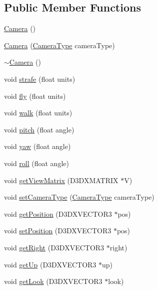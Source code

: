\subsection*{Public Member Functions}
\begin{DoxyCompactItemize}
\item 
\hyperlink{class_camera_a01f94c3543f56ede7af49dc778f19331}{Camera} ()
\item 
\hyperlink{class_camera_a96588034f9824c5504cec810bd7aa9d7}{Camera} (\hyperlink{class_camera_ae94737abf74ae95b4c77a0dc931d5b1b}{Camera\-Type} camera\-Type)
\item 
\hyperlink{class_camera_ad1897942d0ccf91052386388a497349f}{$\sim$\-Camera} ()
\item 
void \hyperlink{class_camera_a33abef22b3b0578383870b053654f0b7}{strafe} (float units)
\item 
void \hyperlink{class_camera_a9bcca4423ec1d9098d185f9f57fa3f5a}{fly} (float units)
\item 
void \hyperlink{class_camera_a87b52396cb7c8f07bb1f383f764308ef}{walk} (float units)
\item 
void \hyperlink{class_camera_a49e00b90b94853e4485a6bdf063796de}{pitch} (float angle)
\item 
void \hyperlink{class_camera_ab4eab94754431725c572d528a07a35cc}{yaw} (float angle)
\item 
void \hyperlink{class_camera_a72be99f88b1cc21122178109d3441818}{roll} (float angle)
\item 
void \hyperlink{class_camera_aebdb20cc455865abfbda1bc3f1452c5d}{get\-View\-Matrix} (D3\-D\-X\-M\-A\-T\-R\-I\-X $\ast$V)
\item 
void \hyperlink{class_camera_abade694c882fe630b65dc78db3bec6fc}{set\-Camera\-Type} (\hyperlink{class_camera_ae94737abf74ae95b4c77a0dc931d5b1b}{Camera\-Type} camera\-Type)
\item 
void \hyperlink{class_camera_a340c68c887d1c5091a571ac9985510db}{get\-Position} (D3\-D\-X\-V\-E\-C\-T\-O\-R3 $\ast$pos)
\item 
void \hyperlink{class_camera_a86aeb83413ed7e07793471d493336c54}{set\-Position} (D3\-D\-X\-V\-E\-C\-T\-O\-R3 $\ast$pos)
\item 
void \hyperlink{class_camera_a70c3d50d23eb1094d29f1d9cc2328800}{get\-Right} (D3\-D\-X\-V\-E\-C\-T\-O\-R3 $\ast$right)
\item 
void \hyperlink{class_camera_aba494d36700de3b9c978e1a881aaa401}{get\-Up} (D3\-D\-X\-V\-E\-C\-T\-O\-R3 $\ast$up)
\item 
void \hyperlink{class_camera_a6b9a394dc61e678e44dd9f4331871f52}{get\-Look} (D3\-D\-X\-V\-E\-C\-T\-O\-R3 $\ast$look)
\end{DoxyCompactItemize}


